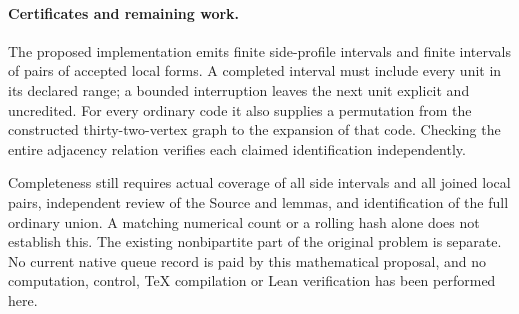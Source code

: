 \documentclass[11pt]{article}
\begin{document}
\paragraph{Certificates and remaining work.}
The proposed implementation emits finite side-profile intervals and
finite intervals of pairs of accepted local forms. A completed interval
must include every unit in its declared range; a bounded interruption
leaves the next unit explicit and uncredited. For every ordinary code it
also supplies a permutation from the constructed thirty-two-vertex graph
to the expansion of that code. Checking the entire adjacency relation
verifies each claimed identification independently.

Completeness still requires actual coverage of all side intervals and
all joined local pairs, independent review of the Source and lemmas,
and identification of the full ordinary union. A matching numerical
count or a rolling hash alone does not establish this. The existing
nonbipartite part of the original problem is separate. No current native
queue record is paid by this mathematical proposal, and no computation,
control, TeX compilation or Lean verification has been performed here.
\end{document}
